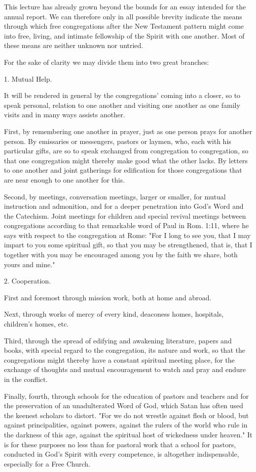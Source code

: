 This lecture has already grown beyond the bounds for an essay intended for the annual report.
We can therefore only in all possible brevity indicate the means through which free congregations after the New Testament pattern might come into free, living, and intimate fellowship of the Spirit with one another. Most of these means are neither unknown nor untried.

For the sake of clarity we may divide them into two great branches:

1. Mutual Help.

It will be rendered in general by the congregations' coming into a closer, so to speak personal, relation to one another and visiting one another as one family visits and in many ways assists another.

First, by remembering one another in prayer, just as one person prays for another person. By emissaries or messengers, pastors or laymen, who, each with his particular gifts, are so to speak exchanged from congregation to congregation, so that one congregation might thereby make good what the other lacks. By letters to one another and joint gatherings for edification for those congregations that are near enough to one another for this.

Second, by meetings, conversation meetings, larger or smaller, for mutual instruction and admonition, and for a deeper penetration into God's Word and the Catechism. Joint meetings for children and special revival meetings between congregations according to that remarkable word of Paul in Rom. 1:11, where he says with respect to the congregation at Rome: "For I long to see you, that I may impart to you some spiritual gift, so that you may be strengthened, that is, that I together with you may be encouraged among you by the faith we share, both yours and mine."

2. Cooperation.

First and foremost through mission work, both at home and abroad.

Next, through works of mercy of every kind, deaconess homes, hospitals, children's homes, etc.

Third, through the spread of edifying and awakening literature, papers and books, with special regard to the congregation, its nature and work, so that the congregations might thereby have a constant spiritual meeting place, for the exchange of thoughts and mutual encouragement to watch and pray and endure in the conflict.

Finally, fourth, through schools for the education of pastors and teachers and for the preservation of an unadulterated Word of God, which Satan has often used the keenest scholars to distort. "For we do not wrestle against flesh or blood, but against principalities, against powers, against the rulers of the world who rule in the darkness of this age, against the spiritual host of wickedness under heaven." It is for these purposes no less than for pastoral work that a school for pastors, conducted in God's Spirit with every competence, is altogether indispensable, especially for a Free Church.

